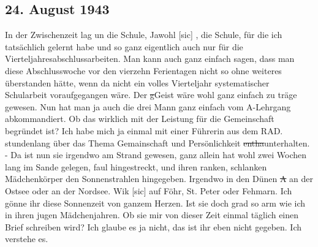 \subsection{24. August 1943}

In der Zwischenzeit lag un die Schule, Jawohl{\color{red} [sic] }, die Schule, f\"{u}r die ich tats\"{a}chlich gelernt habe und so ganz eigentlich auch nur f\"{u}r die Vierteljahresabschlussarbeiten.
Man kann auch ganz einfach sagen, dass man diese Abschlusswoche vor den vierzehn Ferientagen nicht so ohne weiteres \"{u}berstanden h\"{a}tte, wenn da nicht ein volles Vierteljahr systematischer Schularbeit voraufgegangen w\"{a}re.
Der \st{g}Geist w\"{a}re wohl ganz einfach zu tr\"{a}ge gewesen.
Nun hat man ja auch die drei Mann ganz einfach vom A-Lehrgang abkommandiert.
Ob das wirklich mit der Leistung f\"{u}r die Gemeinschaft begr\"{u}ndet ist?
Ich habe mich ja einmal mit einer F\"{u}hrerin aus dem RAD. stundenlang \"{u}ber das Thema Gemainschaft und Pers\"{o}nlichkeit \st{entha}unterhalten.
- Da ist nun sie irgendwo am Strand gewesen, ganz allein hat wohl zwei Wochen lang im Sande gelegen, faul hingestreckt, und ihren ranken, schlanken M\"{a}dchenk\"{o}rper den Sonnenstrahlen hingegeben.
Irgendwo in den D\"{u}nen \st{A} an der Ostsee oder an der Nordsee.
Wik{\color{red} [sic] } auf F\"{o}hr, St. Peter oder Fehmarn.
Ich g\"{o}nne ihr diese Sonnenzeit von ganzem Herzen.
Ist sie doch grad so arm wie ich in ihren jugen M\"{a}dchenjahren.
Ob sie mir von dieser Zeit einmal t\"{a}glich einen Brief schreiben wird?
Ich glaube es ja nicht, das ist ihr eben nicht gegeben.
Ich verstehe es.

\clearpage
